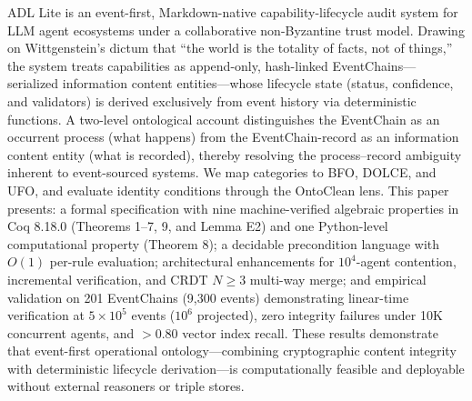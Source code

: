 ADL Lite is an event-first, Markdown-native capability-lifecycle audit system for LLM agent ecosystems under a collaborative non-Byzantine trust model. Drawing on Wittgenstein's dictum that ``the world is the totality of facts, not of things,'' the system treats capabilities as append-only, hash-linked EventChains---serialized information content entities---whose lifecycle state (status, confidence, and validators) is derived exclusively from event history via deterministic functions. A two-level ontological account distinguishes the EventChain as an occurrent process (what happens) from the EventChain-record as an information content entity (what is recorded), thereby resolving the process--record ambiguity inherent to event-sourced systems. We map categories to BFO, DOLCE, and UFO, and evaluate identity conditions through the OntoClean lens. This paper presents: a formal specification with nine machine-verified algebraic properties in Coq 8.18.0 (Theorems 1--7, 9, and Lemma E2) and one Python-level computational property (Theorem 8); a decidable precondition language with $O(1)$ per-rule evaluation; architectural enhancements for $10^4$-agent contention, incremental verification, and CRDT $N{\geq}3$ multi-way merge; and empirical validation on 201 EventChains (9,300 events) demonstrating linear-time verification at $5\times10^5$ events ($10^6$ projected), zero integrity failures under 10K concurrent agents, and ${>}0.80$ vector index recall. These results demonstrate that event-first operational ontology---combining cryptographic content integrity with deterministic lifecycle derivation---is computationally feasible and deployable without external reasoners or triple stores.
